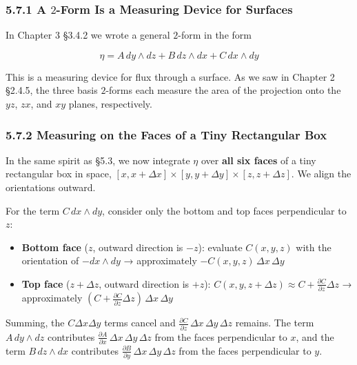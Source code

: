\documentclass[a4paper,12pt,openany]{book}
\begin{document}
\hypertarget{a-2-form-is-a-measuring-device-for-surfaces}{%
\subsubsection{\texorpdfstring{5.7.1 A \(2\)-Form Is a Measuring Device
for
Surfaces}{5.7.1 A 2-Form Is a Measuring Device for Surfaces}}\label{a-2-form-is-a-measuring-device-for-surfaces}}

In Chapter 3 §3.4.2 we wrote a general \(2\)-form in the form

\[\eta = A\,dy \wedge dz + B\,dz \wedge dx + C\,dx \wedge dy\]

This is a measuring device for flux through a surface. As we saw in
Chapter 2 §2.4.5, the three basis \(2\)-forms each measure the area of
the projection onto the \(yz\), \(zx\), and \(xy\) planes, respectively.

\hypertarget{measuring-on-the-faces-of-a-tiny-rectangular-box}{%
\subsubsection{5.7.2 Measuring on the Faces of a Tiny Rectangular
Box}\label{measuring-on-the-faces-of-a-tiny-rectangular-box}}

In the same spirit as §5.3, we now integrate \(\eta\) over
\textbf{all six faces} of a tiny rectangular box in space,
\([x, x+\Delta x] \times [y, y+\Delta y] \times [z, z+\Delta z]\). We
align the orientations outward.

For the term \(C\,dx \wedge dy\), consider only the bottom and top faces
perpendicular to \(z\):

\begin{itemize}
\item
  \textbf{Bottom face} (\(z\), outward direction is \(-z\)): evaluate
  \(C(x,y,z)\) with the orientation of \(-dx \wedge dy\) → approximately
  \(-C(x,y,z)\,\Delta x\,\Delta y\)
\item
  \textbf{Top face} (\(z+\Delta z\), outward direction is \(+z\)):
  \(C(x,y,z+\Delta z) \approx C + \frac{\partial C}{\partial z}\Delta z\)
  → approximately
  \((C + \frac{\partial C}{\partial z}\Delta z)\,\Delta x\,\Delta y\)
\end{itemize}

Summing, the \(C\Delta x\Delta y\) terms cancel and
\(\frac{\partial C}{\partial z}\,\Delta x\,\Delta y\,\Delta z\) remains.
The term \(A\,dy \wedge dz\) contributes
\(\frac{\partial A}{\partial x}\,\Delta x\,\Delta y\,\Delta z\) from the
faces perpendicular to \(x\), and the term \(B\,dz \wedge dx\)
contributes
\(\frac{\partial B}{\partial y}\,\Delta x\,\Delta y\,\Delta z\) from the
faces perpendicular to \(y\).
\end{document}
